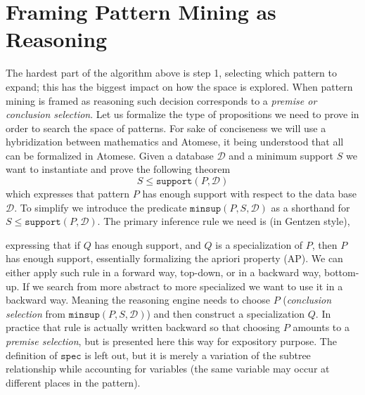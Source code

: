 \documentclass[runningheads]{llncs}
\begin{document}
\section{Framing Pattern Mining as Reasoning}
\label{FPMR}

The hardest part of the algorithm above is step 1, selecting which
pattern to expand; this has the biggest impact on how the space is
explored. When pattern mining is framed as reasoning such decision
corresponds to a \emph{premise or conclusion selection}. Let us
formalize the type of propositions we need to prove in order to search
the space of patterns. For sake of conciseness we will use a
hybridization between mathematics and Atomese, it being understood
that all can be formalized in Atomese.  Given a database $\mathcal{D}$
and a minimum support $S$ we want to instantiate and prove the
following theorem
$$ S \le \texttt{support}(P, \mathcal{D}) $$ which expresses that
pattern $P$ has enough support with respect to the data base
$\mathcal{D}$. To simplify we introduce the predicate $
\texttt{minsup}(P, S, \mathcal{D})$ as a shorthand for $S \le
\texttt{support}(P, \mathcal{D}) $. The primary inference rule we need
is (in Gentzen style),
\begin{prooftree}
\end{prooftree}
expressing that if $Q$ has enough support, and $Q$ is a specialization
of $P$, then $P$ has enough support, essentially formalizing the
apriori property (AP). We can either apply such rule in a forward way,
top-down, or in a backward way, bottom-up. If we search from more
abstract to more specialized we want to use it in a backward
way. Meaning the reasoning engine needs to choose $P$
(\emph{conclusion selection} from $\texttt{minsup}(P, S,
\mathcal{D})$) and then construct a specialization $Q$.  In practice
that rule is actually written backward so that choosing $P$ amounts to
a \emph{premise selection}, but is presented here this way for
expository purpose.  The definition of $\texttt{spec}$ is left out,
but it is merely a variation of the subtree relationship while
accounting for variables (the same variable may occur at different
places in the pattern).
\end{document}
